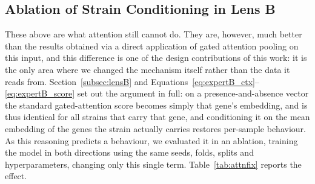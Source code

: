 \documentclass[journal]{IEEEtran}
\begin{document}
\subsection{Ablation of Strain Conditioning in Lens B}
\label{subsec:strainablation}

These above are what attention still cannot do. They are, however, much better than
the results obtained via a direct application of gated attention pooling on this
input, and this difference is one of the design contributions of this work: it is the
only area where we changed the mechanism itself rather than the data it reads from.
Section~\ref{subsec:lensB} and
Equations~\eqref{eq:expertB_ctx}--\eqref{eq:expertB_score} set out the argument in
full: on a presence-and-absence vector the standard gated-attention score becomes
simply that gene's embedding, and is thus identical for all strains that carry that
gene, and conditioning it on the mean embedding of the genes the strain actually
carries restores per-sample behaviour. As this reasoning predicts a behaviour, we
evaluated it in an ablation, training the model in both directions using the same
seeds, folds, splits and hyperparameters, changing only this single term.
Table~\ref{tab:attnfix} reports the effect.
\end{document}
